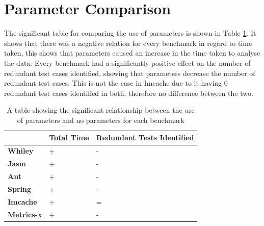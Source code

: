 \section{Parameter Comparison}

The significant table for comparing the use of parameters is shown in Table \ref{parametersig}. It shows that there was a negative relation for every benchmark in regard to time taken, this shows that parameters caused an increase in the time taken to analyse the data. Every benchmark had a significantly positive effect on the number of redundant test cases identified, showing that parameters decrease the number of redundant test cases. This is not the case in Imcache due to it having 0 redundant test cases identified in both, therefore no difference between the two.


\begin{table}[]
\centering
\caption{A table showing the significant relationship between the use of parameters and no parameters for each benchmark}
\label{parametersig}
\begin{tabular}{|l|l|l|}
\hline
{\bf }          & {\bf Total Time} & {\bf Redundant Tests Identified} \\ \hline
{\bf Whiley}    & +                & -                           \\ \hline
{\bf Jasm}      & +               & -                          \\ \hline
{\bf Ant}       & +                & -                           \\ \hline
{\bf Spring}    & +                & -                           \\ \hline
{\bf Imcache}   & +                & =                           \\ \hline
{\bf Metrics-x} & +                & -                           \\ \hline
\end{tabular}
\end{table}

